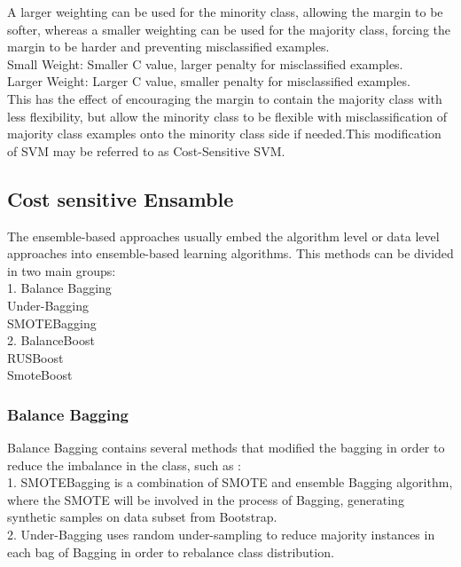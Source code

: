 A larger weighting can be used for the minority class, allowing the margin to be softer, whereas a smaller weighting can be used for the majority class, forcing the margin to be harder and preventing misclassified examples. \noindent \\

\noindent
Small Weight: Smaller C value, larger penalty for misclassified examples. \noindent \\
\noindent
Larger Weight: Larger C value, smaller penalty for misclassified examples. \noindent \\

\noindent
This has the effect of encouraging the margin to contain the majority class with less flexibility, but allow the minority class to be flexible with misclassification of majority class examples onto the minority class side if needed.This modification of SVM may be referred to as Cost-Sensitive SVM.


\subsection{Cost sensitive Ensamble}

The ensemble-based approaches usually embed the algorithm level or data level approaches into ensemble-based learning algorithms.
This methods can be divided in two main groups:\noindent \\
1. Balance Bagging \noindent \\
  	Under-Bagging \noindent \\
    SMOTEBagging  \noindent \\
2. BalanceBoost \noindent \\
   RUSBoost \noindent \\
    SmoteBoost \noindent \\

    
\subsubsection{Balance Bagging} 

Balance Bagging contains several methods that modified the bagging in order to reduce the imbalance in the class, such as :\noindent \\
1. SMOTEBagging is a combination of SMOTE and ensemble Bagging algorithm, where the SMOTE will be involved in the process of Bagging, generating synthetic samples on data subset from Bootstrap. \noindent \\
2. Under-Bagging uses random under-sampling to reduce majority instances in each bag of Bagging in order to rebalance class distribution.\noindent \\
 
